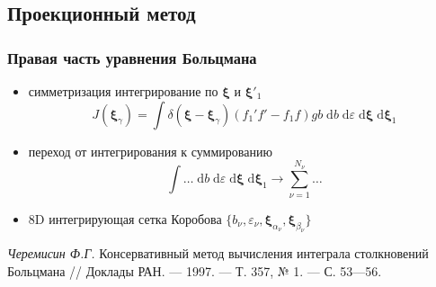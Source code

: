 \documentclass[ucs]{beamer}
\newcommand{\dd}{\;\mathrm{d}}
\begin{document}
\subsection{Проекционный метод}
\begin{frame}
	\frametitle{Правая часть уравнения Больцмана}
	\begin{itemize}
		\item симметризация интегрирование по \(\boldsymbol\xi\) и \(\boldsymbol\xi'_1\)
			\[
				J(\boldsymbol\xi_\gamma) = \int\delta(\boldsymbol\xi-\boldsymbol\xi_\gamma)
				(f_1' f' - f_1 f) gb \dd{b} \dd\varepsilon \dd\boldsymbol\xi \dd\boldsymbol\xi_1
			\]
		\item переход от интегрирования к суммированию
			\[ \int\dots\dd{b}\dd\varepsilon\dd\boldsymbol\xi\dd\boldsymbol\xi_1 \to \sum\limits_{\nu=1}^{N_\nu}\dots \]
		\item 8D интегрирующая сетка Коробова \( \{b_\nu,\varepsilon_\nu,\boldsymbol\xi_{\alpha_\nu},\boldsymbol\xi_{\beta_\nu}\} \)
	\end{itemize}
	\begin{block}{}
		\textit{Черемисин Ф.Г.} Консервативный метод вычисления интеграла столкновений Больцмана
			// Доклады РАН. — 1997. — Т. 357, № 1. — С. 53—56.
	\end{block}
\end{frame}
\end{document}
